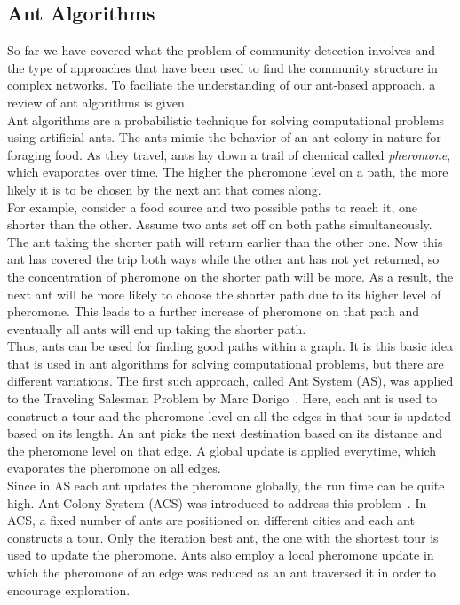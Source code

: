 \begin{spacing}{1.5}
\section{Ant Algorithms}
So far we have covered what the problem of community detection involves and the type of approaches that have been used to find the community structure in complex networks. To faciliate the understanding of our ant-based approach, a review of ant algorithms is given.\\ \indent Ant algorithms are a probabilistic technique for solving computational problems using artificial ants. The ants mimic the behavior of an ant colony in nature for foraging food. As they travel, ants lay down a trail of chemical called \emph{pheromone}, which evaporates over time. The higher the pheromone level on a path, the more likely it is to be chosen by the next ant that comes along.\\
\indent For example, consider a food source and two possible paths to reach it, one shorter than the other. Assume two ants set off on both paths simultaneously. The ant taking the shorter path will return earlier than the other one. Now this ant has covered the trip both ways while the other ant has not yet returned, so the concentration of pheromone on the shorter path will be more. As a result, the next ant will be more likely to choose the shorter path due to its higher level of pheromone. This leads to a further increase of pheromone on that path and eventually all ants will end up taking the shorter path.\\
\indent Thus, ants can be used for finding good paths within a graph. It is this basic idea that is used in ant algorithms for solving computational problems, but there are different variations. The first such approach, called Ant System (AS), was applied to the Traveling Salesman Problem by Marc Dorigo~\cite{dorigo1992}. Here, each ant is used to construct a tour and the pheromone level on all the edges in that tour is updated based on its length. An ant picks the next destination based on its distance and the pheromone level on that edge. A global update is applied everytime, which evaporates the pheromone on all edges.\\
\indent Since in AS each ant updates the pheromone globally, the run time can be quite high. Ant Colony System (ACS) was introduced to address this problem~\cite{585892}. In ACS, a fixed number of ants are positioned on different cities and each ant constructs a tour. Only the iteration best ant, the one with the shortest tour is used to update the pheromone. Ants also employ a local pheromone update in which the pheromone of an edge was reduced as an ant traversed it in order to encourage exploration.\\

\end{spacing}
